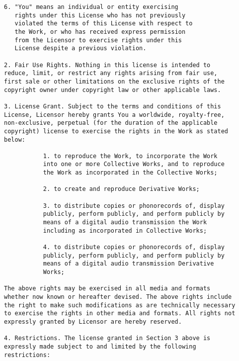 \begin{Verbatim}[fontsize=\scriptsize]
   6. "You" means an individual or entity exercising
   rights under this License who has not previously
   violated the terms of this License with respect to
   the Work, or who has received express permission
   from the Licensor to exercise rights under this
   License despite a previous violation.

2. Fair Use Rights. Nothing in this license is intended to
reduce, limit, or restrict any rights arising from fair use,
first sale or other limitations on the exclusive rights of the
copyright owner under copyright law or other applicable laws.

3. License Grant. Subject to the terms and conditions of this
License, Licensor hereby grants You a worldwide, royalty-free,
non-exclusive, perpetual (for the duration of the applicable
copyright) license to exercise the rights in the Work as stated
below:

           1. to reproduce the Work, to incorporate the Work
           into one or more Collective Works, and to reproduce
           the Work as incorporated in the Collective Works;
        
           2. to create and reproduce Derivative Works;
        
           3. to distribute copies or phonorecords of, display
           publicly, perform publicly, and perform publicly by
           means of a digital audio transmission the Work
           including as incorporated in Collective Works;
        
           4. to distribute copies or phonorecords of, display
           publicly, perform publicly, and perform publicly by
           means of a digital audio transmission Derivative
           Works;

The above rights may be exercised in all media and formats
whether now known or hereafter devised. The above rights include
the right to make such modifications as are technically necessary
to exercise the rights in other media and formats. All rights not
expressly granted by Licensor are hereby reserved.

4. Restrictions. The license granted in Section 3 above is
expressly made subject to and limited by the following
restrictions:


\end{Verbatim}
